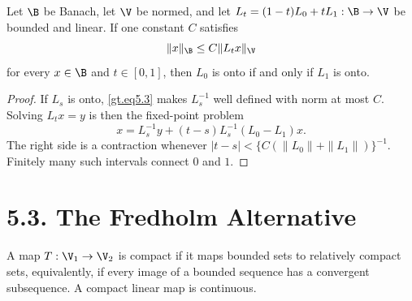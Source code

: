 \begin{theorem}\label{gt.thm5.2}
Let $\B$ be Banach, let $\V$ be normed, and let
$L_t=(1-t)L_0+tL_1:\B\to\V$ be bounded and linear. If one constant $C$
satisfies
\begin{equation}\label{gt.eq5.3}
\|x\|_{\B}\leq C\|L_tx\|_{\V}
\end{equation}
for every $x\in\B$ and $t\in[0,1]$, then $L_0$ is onto if and only if
$L_1$ is onto.
\end{theorem}
\begin{proof}
\sketch If $L_s$ is onto, \eqref{gt.eq5.3} makes $L_s^{-1}$ well defined
with norm at most $C$. Solving $L_tx=y$ is then the fixed-point problem
\[
x=L_s^{-1}y+(t-s)L_s^{-1}(L_0-L_1)x.
\]
The right side is a contraction whenever
$|t-s|<\{C(\|L_0\|+\|L_1\|)\}^{-1}$. Finitely many such intervals connect
$0$ and $1$.
\end{proof}

\section*{5.3. The Fredholm Alternative}

\begin{definition}\label{gt.def5.3.compact-mapping}
A map $T:\V_1\to\V_2$ is compact if it maps bounded sets to relatively
compact sets, equivalently, if every image of a bounded sequence has a
convergent subsequence. A compact linear map is continuous.
\end{definition}

